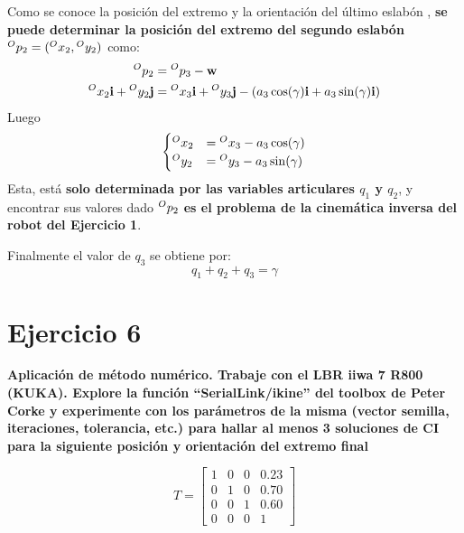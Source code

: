 \documentclass[a4paper,12pt]{article}
\begin{document}
Como se conoce la posición del extremo y la orientación del último eslabón , \textbf{se puede determinar la posición del extremo del segundo eslabón} $\prescript{O}{}{p_2} = (\prescript{O}{}{x_2}, \prescript{O}{}{y_2})$ como:
\begin{align*}
    \prescript{O}{}{p_2} &= \prescript{O}{}{p_3} - \mathbf{w}\\
    \prescript{O}{}{x_2}\mathbf{i} + \prescript{O}{}{y_2}\mathbf{j} &= \prescript{O}{}{x_3}\mathbf{i} + \prescript{O}{}{y_3}\mathbf{j} - \left(a_3\cos(\gamma)\mathbf{i} + a_3\sin(\gamma)\mathbf{i}\right)\\
\end{align*}
Luego
\begin{align*}
    \begin{cases}
        \prescript{O}{}{x_2} &= \prescript{O}{}{x_3} - a_3\cos(\gamma)\\
        \prescript{O}{}{y_2} &= \prescript{O}{}{y_3} - a_3\sin(\gamma)
    \end{cases}
\end{align*}
Esta, está \textbf{solo determinada por las variables articulares $q_1$ y $q_2$}, y encontrar sus valores dado $\prescript{O}{}{p_2}$ \textbf{es el problema de la cinemática inversa del robot del Ejercicio 1}.

Finalmente el valor de $q_3$ se obtiene por:
\[
    q_1 + q_2 + q_3 = \gamma
\]

\section{Ejercicio 6}
\textbf{Aplicación de método numérico. Trabaje con el LBR iiwa 7 R800 (KUKA). Explore la
función ``SerialLink/ikine'' del toolbox de Peter Corke y experimente con los parámetros de la
misma (vector semilla, iteraciones, tolerancia, etc.) para hallar al menos 3 soluciones de CI
para la siguiente posición y orientación del extremo final}

\begin{equation*}
    T = 
    \begin{bmatrix}
        1 & 0 & 0 & 0.23\\
        0 & 1 & 0 & 0.70\\
        0 & 0 & 1 & 0.60\\
        0 & 0 & 0 & 1
    \end{bmatrix}
\end{equation*}




\end{document}
